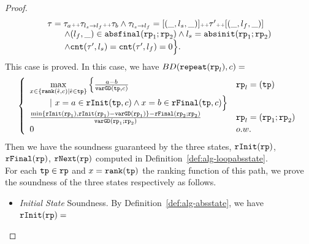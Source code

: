 \begin{proof}
\[\begin{array}{l}
      \mathtt{\tau} = \mathtt{\tau}_a {\scriptscriptstyle ++} \mathtt{\tau}_{l_s \to l_f} {\scriptscriptstyle ++} \mathtt{\tau}_b
      \land \mathtt{\tau}_{l_s \to l_f} = [(\_, l_s, \_)] {\scriptscriptstyle ++} \mathtt{\tau}' {\scriptscriptstyle ++} [(\_, l_f, \_)]
      \\ \qquad
      \land (l_{f}, \_) \in \mathtt{abs}{\mathtt{final}}(\mathtt{rp}_1; \mathtt{rp}_2)
      \land l_s = \mathtt{abs}{\mathtt{init}}(\mathtt{rp}_1; \mathtt{rp}_2)
      \\ \qquad
      \land \mathtt{cnt}(\mathtt{\tau}', l_s) = \mathtt{cnt}(\mathtt{\tau}', l_f) = 0 
      \Big\}.
        \end{array}
    \]
This case is proved.
In this case, we have $  BD(\mathtt{repeat}(\mathtt{rp}_l), c) =$
\[
  \left\{ 
  \begin{array}{lll}
    \max\limits_{x \in \left\{ \rank(\absevent, c) | \absevent \in \tpath \right\}}
    \Big\{ \highlight{\frac{a - b}{\varGD(\tpath, c)}}  &  \rprog_l = (\tpath)
    \\ \qquad 
    ~\vert~
    x = a \in \rfinit(\tpath, c)
    \land x = b \in \rffinal(\tpath, c)
    \Big\} 
    \\
    \frac{\min\{ \rfinit(\rprog_1), \rfinit(\rprog_1) - \varGD(\rprog_1) \} - \rffinal(\rprog_2;\rprog_2)}{ 
    \varGD(\rprog_1;\rprog_2)}  & \rprog_l = (\rprog_1;\rprog_2)
    \\
    0  &  o.w.
\end{array}
\right.
\]
Then we have the soundness guaranteed by the three states,
$\mathtt{rInit}(\mathtt{rp})$, $\mathtt{rFinal}(\mathtt{rp})$, $\mathtt{rNext}(\mathtt{rp})$ computed in Definition~\ref{def:alg-loopabsstate}.
\\
For each $\mathtt{tp} \in \mathtt{rp}$ and $x = \mathtt{rank}(\mathtt{tp})$ the ranking function of this path, we prove the soundness of the three states respectively as follows.
\begin{itemize}
 \item \emph{Initial State} Soundness.
 By Definition~\ref{def:alg-absstate}, we have $\mathtt{rInit}(\mathtt{rp}) = $ 

\end{itemize}
\end{proof}
